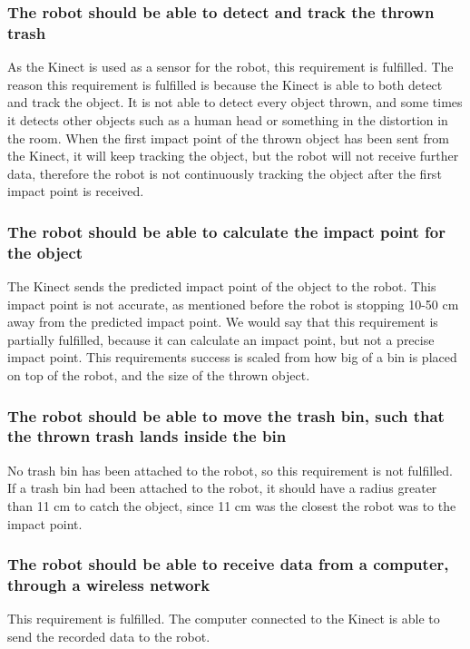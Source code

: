 \subsubsection{The robot should be able to detect and track the thrown trash}
As the Kinect is used as a sensor for the robot, this requirement is fulfilled. The reason this requirement is fulfilled is because the Kinect is able to both detect and track the object. It is not able to detect every object thrown, and some times it detects other objects such as a human head or something in the distortion in the room. \newline
When the first impact point of the thrown object has been sent from the Kinect, it will keep tracking the object, but the robot will not receive further data, therefore the robot is not continuously tracking the object after the first impact point is received.  

\subsubsection{The robot should be able to calculate the impact point for the object}
The Kinect sends the predicted impact point of the object to the robot. This impact point is not accurate, as mentioned before the robot is stopping 10-50 cm away from the predicted impact point. We would say that this requirement is partially fulfilled, because it can calculate an impact point, but not a precise impact point. This requirements success is scaled from how big of a bin is placed on top of the robot, and the size of the thrown object.

\subsubsection{The robot should be able to move the trash bin, such that the thrown trash lands inside the bin} 
No trash bin has been attached to the robot, so this requirement is not fulfilled. If a trash bin had been attached to the robot, it should have a radius greater than 11 cm to catch the object, since 11 cm was the closest the robot was to the impact point.

\subsubsection{The robot should be able to receive data from a computer, through a wireless network} This requirement is fulfilled. The computer connected to the Kinect is able to send the recorded data to the robot. 

